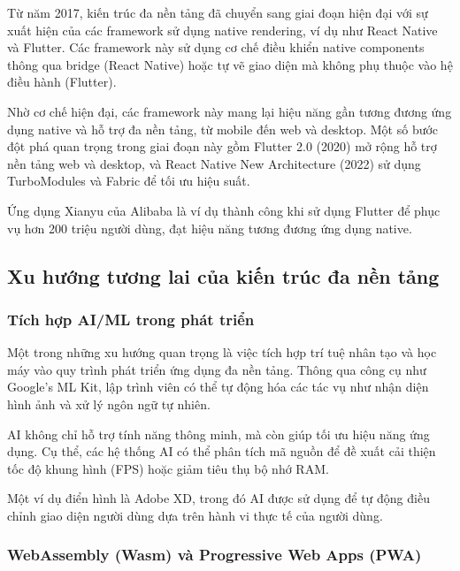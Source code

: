  Từ năm 2017, kiến trúc đa nền tảng đã chuyển sang giai đoạn hiện đại với sự xuất hiện của các framework sử dụng native rendering, ví dụ như React Native và Flutter. Các framework này sử dụng cơ chế điều khiển native components thông qua bridge (React Native) hoặc tự vẽ giao diện mà không phụ thuộc vào hệ điều hành (Flutter).

\vspace{0.5em}

Nhờ cơ chế hiện đại, các framework này mang lại hiệu năng gần tương đương ứng dụng native và hỗ trợ đa nền tảng, từ mobile đến web và desktop. Một số bước đột phá quan trọng trong giai đoạn này gồm Flutter 2.0 (2020) mở rộng hỗ trợ nền tảng web và desktop, và React Native New Architecture (2022) sử dụng TurboModules và Fabric để tối ưu hiệu suất.

\vspace{0.5em}

\indent Ứng dụng Xianyu của Alibaba là ví dụ thành công khi sử dụng Flutter để phục vụ hơn 200 triệu người dùng, đạt hiệu năng tương đương ứng dụng native.
\subsection{Xu hướng tương lai của kiến trúc đa nền tảng}
\renewcommand{\labelitemi}{--}

\subsubsection{Tích hợp AI/ML trong phát triển}

Một trong những xu hướng quan trọng là việc tích hợp trí tuệ nhân tạo và học máy vào quy trình phát triển ứng dụng đa nền tảng. Thông qua công cụ như Google’s ML Kit, lập trình viên có thể tự động hóa các tác vụ như nhận diện hình ảnh và xử lý ngôn ngữ tự nhiên.

\vspace{0.5em}

AI không chỉ hỗ trợ tính năng thông minh, mà còn giúp tối ưu hiệu năng ứng dụng. Cụ thể, các hệ thống AI có thể phân tích mã nguồn để đề xuất cải thiện tốc độ khung hình (FPS) hoặc giảm tiêu thụ bộ nhớ RAM.

\vspace{0.5em}

Một ví dụ điển hình là Adobe XD, trong đó AI được sử dụng để tự động điều chỉnh giao diện người dùng dựa trên hành vi thực tế của người dùng.


\subsubsection{WebAssembly (Wasm) và Progressive Web Apps (PWA)}

